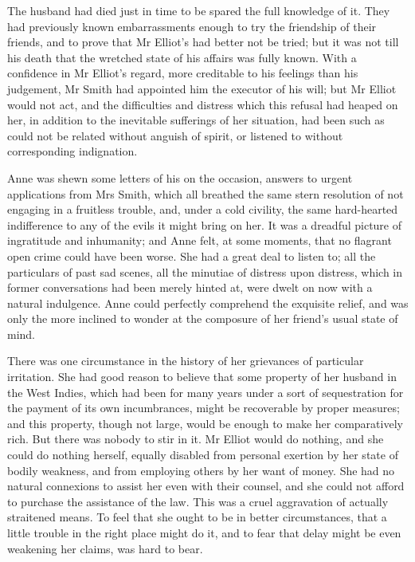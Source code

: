 The husband had died just in time to be spared the full knowledge of it. They had previously known embarrassments enough to try the friendship of their friends, and to prove that Mr Elliot's had better not be tried; but it was not till his death that the wretched state of his affairs was fully known. With a confidence in Mr Elliot's regard, more creditable to his feelings than his judgement, Mr Smith had appointed him the executor of his will; but Mr Elliot would not act, and the difficulties and distress which this refusal had heaped on her, in addition to the inevitable sufferings of her situation, had been such as could not be related without anguish of spirit, or listened to without corresponding indignation.

Anne was shewn some letters of his on the occasion, answers to urgent applications from Mrs Smith, which all breathed the same stern resolution of not engaging in a fruitless trouble, and, under a cold civility, the same hard-hearted indifference to any of the evils it might bring on her. It was a dreadful picture of ingratitude and inhumanity; and Anne felt, at some moments, that no flagrant open crime could have been worse. She had a great deal to listen to; all the particulars of past sad scenes, all the minutiae of distress upon distress, which in former conversations had been merely hinted at, were dwelt on now with a natural indulgence. Anne could perfectly comprehend the exquisite relief, and was only the more inclined to wonder at the composure of her friend's usual state of mind.

There was one circumstance in the history of her grievances of particular irritation. She had good reason to believe that some property of her husband in the West Indies, which had been for many years under a sort of sequestration for the payment of its own incumbrances, might be recoverable by proper measures; and this property, though not large, would be enough to make her comparatively rich. But there was nobody to stir in it. Mr Elliot would do nothing, and she could do nothing herself, equally disabled from personal exertion by her state of bodily weakness, and from employing others by her want of money. She had no natural connexions to assist her even with their counsel, and she could not afford to purchase the assistance of the law. This was a cruel aggravation of actually straitened means. To feel that she ought to be in better circumstances, that a little trouble in the right place might do it, and to fear that delay might be even weakening her claims, was hard to bear.

